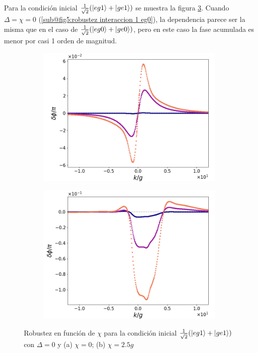 Para la condición inicial $\frac{1}{\sqrt{2}}(\ket{eg1}+\ket{ge1})$ se muestra la figura \ref{fig5:robustez interaccion eg1}. Cuando $\Delta=\chi=0$ (\ref{sub@fig5:robustez interaccion 1 eg0}), la dependencia parece ser la misma que en el caso de $\frac{1}{\sqrt{2}}(\ket{eg0}+\ket{ge0})$, pero en este caso la fase acumulada es menor por casi 1 orden de magnitud. 
\begin{figure}[h]
    \centering
    \begin{subfigure}{0.49\textwidth}
        \includegraphics[width=\textwidth]{figuras/ch5/robustez/k/eg1+ge1 d=0.0g x=0.0g J=0.0g.png}
        \caption{}
        \label{fig5:robustez interaccion 1 eg1}
    \end{subfigure}
    \hfill
    \begin{subfigure}{0.49\textwidth}
        \includegraphics[width=\textwidth]{figuras/ch5/robustez/k/eg1+ge1 d=0.0g x=2.5g J=0.0g.png}
        \caption{}
        \label{fig5:robustez interaccion 2 eg1}
    \end{subfigure}
    \caption{Robustez en función de $\chi$ para la condición inicial $\frac{1}{\sqrt{2}}(\ket{eg1}+\ket{ge1})$ con $\Delta=0$ y (a) $\chi=0$; (b) $\chi=2.5g$}
    \label{fig5:robustez interaccion eg1}
\end{figure}
